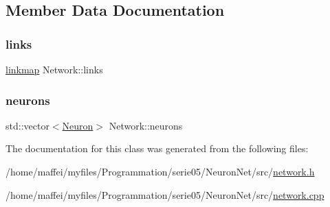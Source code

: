 \subsection{Member Data Documentation}
\mbox{\label{classNetwork_aef1609a9a6b865651417ce995b4575a8}} 
\subsubsection{\texorpdfstring{links}{links}}
{\footnotesize\ttfamily \hyperlink{network_8h_a889f48bcec09c9d72a03648e911c5ff5}{linkmap} Network\+::links\hspace{0.3cm}{\ttfamily [private]}}

\mbox{\label{classNetwork_a1b7832bc2c7b8855cdc3b2d6329eff9d}} 
\subsubsection{\texorpdfstring{neurons}{neurons}}
{\footnotesize\ttfamily std\+::vector$<$\hyperlink{classNeuron}{Neuron}$>$ Network\+::neurons\hspace{0.3cm}{\ttfamily [private]}}



The documentation for this class was generated from the following files\+:\begin{DoxyCompactItemize}
\item 
/home/maffei/myfiles/\+Programmation/serie05/\+Neuron\+Net/src/\hyperlink{network_8h}{network.\+h}\item 
/home/maffei/myfiles/\+Programmation/serie05/\+Neuron\+Net/src/\hyperlink{network_8cpp}{network.\+cpp}\end{DoxyCompactItemize}

